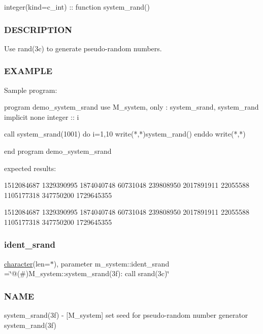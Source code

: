 integer(kind=c\+\_\+int) \+:\+: function system\+\_\+rand() \subsubsection*{D\+E\+S\+C\+R\+I\+P\+T\+I\+ON}

Use rand(3c) to generate pseudo-\/random numbers.

\subsubsection*{E\+X\+A\+M\+P\+LE}

\begin{DoxyVerb}Sample program:

   program demo_system_srand
   use M_system, only : system_srand, system_rand
   implicit none
   integer :: i

   call system_srand(1001)
   do i=1,10
      write(*,*)system_rand()
   enddo
   write(*,*)

   end program demo_system_srand
\end{DoxyVerb}
 expected results\+:

1512084687 1329390995 1874040748 60731048 239808950 2017891911 22055588 1105177318 347750200 1729645355

1512084687 1329390995 1874040748 60731048 239808950 2017891911 22055588 1105177318 347750200 1729645355 \mbox{\label{namespacem__system_a3bdea86816bce4dced7f05da643b499a}} 
\subsubsection{\texorpdfstring{ident\+\_\+srand}{ident\_srand}}
{\footnotesize\ttfamily \hyperlink{option__stopwatch_83_8txt_abd4b21fbbd175834027b5224bfe97e66}{character}(len=$\ast$), parameter m\+\_\+system\+::ident\+\_\+srand =\char`\"{}@(\#)M\+\_\+system\+::system\+\_\+srand(3f)\+: call srand(3c)\char`\"{}\hspace{0.3cm}{\ttfamily [private]}}



\subsubsection*{N\+A\+ME}

system\+\_\+srand(3f) -\/ \mbox{[}M\+\_\+system\mbox{]} set seed for pseudo-\/random number generator system\+\_\+rand(3f) 

